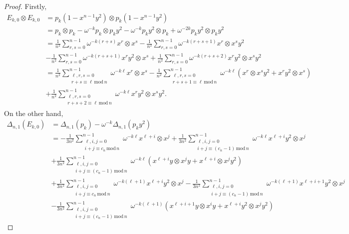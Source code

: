 \documentclass[a4paper,11pt]{amsart}
\begin{document}
\begin{proof}
Firstly, 
\begin{align*}
E_{k,0} \otimes E_{k,0} 
&= p_k(1-x^{n-1}y^2) \otimes p_k(1-x^{n-1}y^2) \\
&= p_k \otimes p_k - \omega^{-k} p_k \otimes p_k y^2 - \omega^{-k} p_k y^2\otimes p_k + \omega^{-2k} p_k y^2\otimes p_k y^2 \\
&= \frac{1}{n^2}\sum_{r, s=0}^{n-1} \omega^{-k(r+s)}x^r \otimes x^s -\frac{1}{n^2}\sum_{r, s=0}^{n-1} \omega^{-k(r+s+1)}x^r \otimes x^sy^2 \\
&- \frac{1}{n^2}\sum_{r, s=0}^{n-1} \omega^{-k(r+s+1)}x^ry^2 \otimes x^s +\frac{1}{n^2}\sum_{r, s=0}^{n-1} \omega^{-k(r+s+2)}x^ry^2 \otimes x^sy^2 \\
&= \frac{1}{n^2}\sum_{\substack{\ell, r, s = 0 \\ r+s \equiv \ell \, \text{mod} \, n}}^{n-1} \omega^{-k\ell}x^r \otimes x^s -\frac{1}{n^2}\sum_{\substack{\ell, r, s = 0 \\ r+s +1\equiv \ell \, \text{mod} \, n}}^{n-1} \omega^{-k\ell}(x^r \otimes x^sy^2 + x^ry^2 \otimes x^s)\\
&+\frac{1}{n^2}\sum_{\substack{\ell, r, s = 0 \\ r+s +2\equiv \ell \, \text{mod} \, n}}^{n-1} \omega^{-k\ell}x^ry^2 \otimes x^sy^2.
\end{align*}
On the other hand,
\begin{align*}
\Delta_{n,1}(E_{k,0})&= \Delta_{n, 1}(p_k)-\omega^{-k}\Delta_{n,1}(p_ky^2
) \\
&=-\frac{1}{3n^2}\sum_{\substack{\ell, i, j = 0 \\ i+j\equiv c_n \, \text{mod} \, n}}^{n-1} \omega^{-k\ell}x^{\ell+i} \otimes x^j  +\frac{1}{3n^2}\sum_{\substack{\ell, i, j = 0 \\ i+j \equiv (c_n-1) \, \text{mod} \, n}}^{n-1} \omega^{-k\ell}x^{\ell+i}y^2 \otimes x^j  \\
&+ \frac{1}{3n^2}\sum_{\substack{\ell, i, j = 0 \\ i+j \equiv (c_n-1) \, \text{mod} \, n}}^{n-1} \omega^{-k\ell}( x^{\ell+i}y \otimes x^jy + x^{\ell+i} \otimes x^jy^2) \\&+\frac{1}{3n^2}\sum_{\substack{\ell, i, j = 0 \\ i+j\equiv c_n \, \text{mod} \, n}}^{n-1} \omega^{-k(\ell+1)}x^{\ell+i}y^2\otimes x^j - \frac{1}{3n^2}\sum_{\substack{\ell, i, j = 0 \\ i+j\equiv (c_n-1) \, \text{mod} \, n}}^{n-1} \omega^{-k(\ell+1)}x^{\ell+i+1}y^2\otimes x^j \\&- \frac{1}{3n^2}\sum_{\substack{\ell, i, j = 0 \\ i+j \equiv (c_n-1) \, \text{mod} \, n}}^{n-1} \omega^{-k(\ell+1)}( x^{\ell+i+1}y \otimes x^iy + x^{\ell+i}y^2 \otimes x^jy^2) 

\end{align*}
\end{proof}
\end{document}
